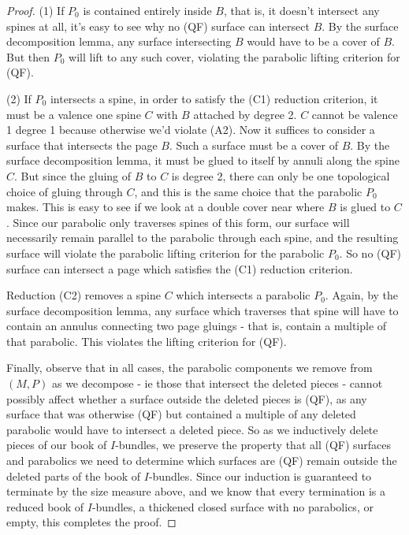 \begin{proof}
(1) If $P_0$ is contained entirely inside $B$, that is, it doesn't intersect
any spines at all, it's easy to see why no (QF) surface can intersect $B$. By
the surface decomposition lemma, any surface intersecting $B$ would have to be
a cover of $B$. But then $P_0$ will lift to any such cover, violating the
parabolic lifting criterion for (QF).

(2) If $P_0$ intersects a spine, in order to satisfy the (C1) reduction
criterion, it must be a valence one spine $C$ with $B$ attached by degree 2.
$C$ cannot be valence 1 degree 1 because otherwise we'd violate (A2). Now it
suffices to consider a surface that intersects the page $B$. Such a surface
must be a cover of $B$. By the surface decomposition lemma, it must be glued to
itself by annuli along the spine $C$. But since the gluing of $B$ to $C$ is
degree 2, there can only be one topological choice of gluing through $C$, and
this is the same choice that the parabolic $P_0$ makes. This is easy to see if
we look at a double cover near where $B$ is glued to $C$. Since our parabolic
only traverses spines of this form, our surface will necessarily remain
parallel to the parabolic through each spine, and the resulting surface will
violate the parabolic lifting criterion for the parabolic $P_0$. So no (QF)
surface can intersect a page which satisfies the (C1) reduction criterion.

Reduction (C2) removes a spine $C$ which intersects a parabolic $P_0$. Again,
by the surface decomposition lemma, any surface which traverses that spine will
have to contain an annulus connecting two page gluings - that is, contain
a multiple of that parabolic. This violates the lifting criterion for (QF).

Finally, observe that in all cases, the parabolic components we remove from
$(M,P)$ as we decompose - ie those that intersect the deleted pieces - cannot
possibly affect whether a surface outside the deleted pieces is (QF), as any
surface that was otherwise (QF) but contained a multiple of any deleted
parabolic would have to intersect a deleted piece. So as we inductively delete
pieces of our book of $I$-bundles, we preserve the property that all (QF)
surfaces and parabolics we need to determine which surfaces are (QF) remain
outside the deleted parts of the book of $I$-bundles. Since our induction is
guaranteed to terminate by the size measure above, and we know that every
termination is a reduced book of $I$-bundles, a thickened closed surface with
no parabolics, or empty, this completes the proof.

\end{proof}

